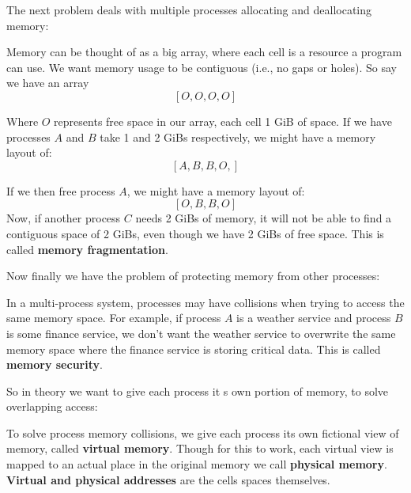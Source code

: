 \noindent
The next problem deals with multiple processes allocating and deallocating memory:

\begin{Def}
    
    Memory can be thought of as a big array, where each cell is a resource a program can use.
    We want memory usage to be contiguous (i.e., no gaps or holes). So say we have an array 
    $$[O, O, O, O]$$

    \noindent
    Where $O$ represents free space in our array, each cell 1 GiB of space. If we have processes $A$ and $B$ take 1 and 2 GiBs respectively, we might have a memory layout of:
    $$[A, B, B, O,]$$

    \noindent
    If we then free process $A$, we might have a memory layout of:
    $$[O, B, B, O]$$
    \noindent
    Now, if another process $C$ needs 2 GiBs of memory, it will not be able to find a contiguous space of 2 GiBs, even though we have 2 GiBs of free space.
    This is called \textbf{memory fragmentation}.
\end{Def}

\noindent
Now finally we have the problem of protecting memory from other processes:

\begin{Def}

    In a multi-process system, processes may have collisions when trying to access the same memory space.
    For example, if process $A$ is a weather service and process $B$ is some finance service, we don't want 
    the weather service to overwrite the same memory space where the finance service is storing critical data.
    This is called \textbf{memory security}.
\end{Def}

\noindent
So in theory we want to give each process it s own portion of memory, to solve overlapping access:
\begin{Def}

    To solve process memory collisions, we give each process its own fictional view of memory, called \textbf{virtual memory}.
    Though for this to work, each virtual view is mapped to an actual place in the original memory we call \textbf{physical memory}.\\

    \noindent
    \textbf{Virtual and physical addresses} are the cells spaces themselves.
\end{Def}

